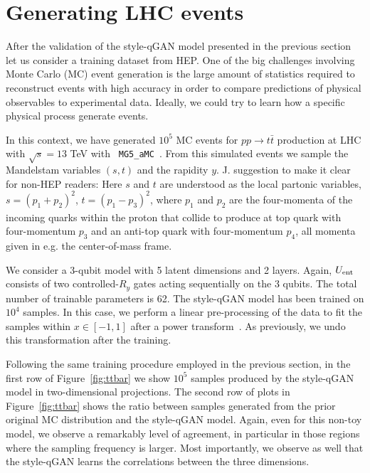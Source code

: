 \documentclass[twocolumn,preprintnumbers,superscriptaddress]{revtex4-2}
\begin{document}
\section{Generating LHC events}
\label{sec:lhc}

After the validation of the style-qGAN model presented in the previous section
let us consider a training dataset from HEP. One of the big challenges involving
Monte Carlo (MC) event generation is the large amount of statistics required to
reconstruct events with high accuracy in order to compare predictions of
physical observables to experimental data. Ideally, we could try
to learn how a specific physical process generate events.

In this context, we have generated $10^5$ MC events for $pp\rightarrow t\bar{t}$
production at LHC with $\sqrt{s} = 13$ TeV with {\tt
MG5\_aMC}~\cite{Alwall:2014hca,Frederix:2018nkq}. From this simulated events we
sample the Mandelstam variables $(s,t)$ and the rapidity
$y$. {\color{red} J. suggestion to make it clear for non-HEP readers: Here $s$
and $t$ are understood as the local partonic variables,
$s=(p_1^{}+p_2^{})^2$, $t=(p_1^{}-p_3^{})_{}^2$, where $p_1^{}$ and
$p_2^{}$ are the four-momenta of the incoming quarks within the proton
that collide to produce at top quark with four-momentum $p_3^{}$ and
an anti-top quark with four-momentum $p_4^{}$, all momenta given in
e.g. the center-of-mass frame.}

We consider a 3-qubit model with 5 latent dimensions and 2 layers. Again, $U_{\rm
ent}$ consists of two controlled-$R_{y}$ gates acting sequentially on the 3
qubits. The total number of trainable parameters is 62. The
style-qGAN model has been trained on $10^4$ samples. In this case, we perform a linear pre-processing of the data to fit the samples within $x \in [-1, 1]$ after a power transform~\cite{yeo2000new}. As previously, we undo this transformation after the training.

Following the same training procedure employed in the previous section, in the
first row of Figure~\ref{fig:ttbar} we show $10^5$ samples produced by the
style-qGAN model in two-dimensional projections.
%
The second row of plots in Figure~\ref{fig:ttbar} shows the ratio between
samples generated from the prior original MC distribution and the style-qGAN
model. Again, even for this non-toy model, we observe a remarkably level of agreement, in particular in those regions
where the sampling frequency is larger. Most importantly, we observe as well that the style-qGAN learns
the correlations between the three dimensions.
\end{document}
